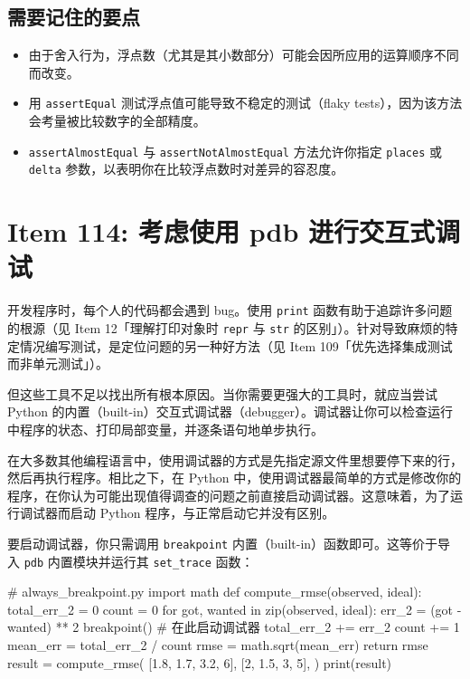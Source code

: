 \subsection{需要记住的要点}

\begin{itemize}
\item 由于舍入行为，浮点数（尤其是其小数部分）可能会因所应用的运算顺序不同而改变。
\item 用 \texttt{assertEqual} 测试浮点值可能导致不稳定的测试（flaky tests），因为该方法会考量被比较数字的全部精度。
\item \texttt{assertAlmostEqual} 与 \texttt{assertNotAlmostEqual} 方法允许你指定 \texttt{places} 或 \texttt{delta} 参数，以表明你在比较浮点数时对差异的容忍度。
\end{itemize}

\section{Item 114: 考虑使用 pdb 进行交互式调试}

开发程序时，每个人的代码都会遇到 bug。使用 \texttt{print} 函数有助于追踪许多问题的根源（见 Item 12「理解打印对象时 \texttt{repr} 与 \texttt{str} 的区别」）。针对导致麻烦的特定情况编写测试，是定位问题的另一种好方法（见 Item 109「优先选择集成测试而非单元测试」）。

但这些工具不足以找出所有根本原因。当你需要更强大的工具时，就应当尝试 Python 的内置（built-in）交互式调试器（debugger）。调试器让你可以检查运行中程序的状态、打印局部变量，并逐条语句地单步执行。

在大多数其他编程语言中，使用调试器的方式是先指定源文件里想要停下来的行，然后再执行程序。相比之下，在 Python 中，使用调试器最简单的方式是修改你的程序，在你认为可能出现值得调查的问题之前直接启动调试器。这意味着，为了运行调试器而启动 Python 程序，与正常启动它并没有区别。

要启动调试器，你只需调用 \texttt{breakpoint} 内置（built-in）函数即可。这等价于导入 \texttt{pdb} 内置模块并运行其 \texttt{set\_trace} 函数：

\begin{codebox}[python]
# always_breakpoint.py
import math
def compute_rmse(observed, ideal):
    total_err_2 = 0
    count = 0
    for got, wanted in zip(observed, ideal):
        err_2 = (got - wanted) ** 2
        breakpoint()  # 在此启动调试器
        total_err_2 += err_2
        count += 1
    mean_err = total_err_2 / count
    rmse = math.sqrt(mean_err)
    return rmse
result = compute_rmse(
    [1.8, 1.7, 3.2, 6],
    [2, 1.5, 3, 5],
)
print(result)
\end{codebox}


